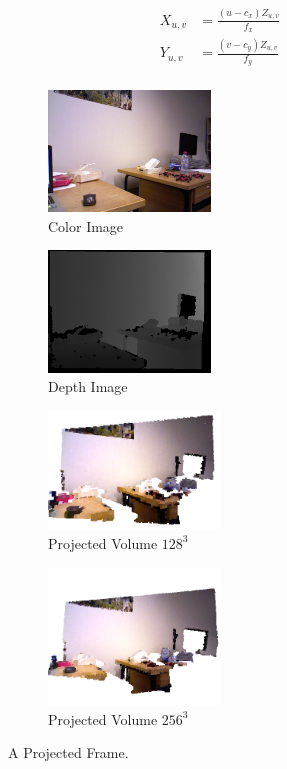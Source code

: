 \begin{equation} \label{eqn:PC_PROJECTION}
\begin{split}
X_{u,v} & = \frac{(u - c_x)Z_{u,v}}{f_x} \\
Y_{u,v} & = \frac{(v - c_y)Z_{u,v}}{f_y} \\
\end{split}
\end{equation}

\begin{figure}[!htb] 
        \centering
        \begin{subfigure}[b]{1.8in}
                \includegraphics[width=1.7in]{images/ch2/colorF11}
                \caption{Color Image}
                \label{fig:COLEXAMPLE}
        \end{subfigure}%
        \begin{subfigure}[b]{1.8in}
                \includegraphics[width=1.7in]{images/ch2/depthF11}
                \caption{Depth Image}
                \label{fig:DEPTHEXAMPLE}
        \end{subfigure}
        
         \begin{subfigure}[b]{1.8in}
                \includegraphics[width=1.8in]{images/ch2/volumeF11128}
                \caption{Projected Volume $128^3$}
                \label{fig:VOLUMEEXAMPLE128}
        \end{subfigure}%
         \begin{subfigure}[b]{1.8in}
                \includegraphics[width=1.8in]{images/ch2/volumeF11256}
                \caption{Projected Volume $256^3$}
                \label{fig:VOLUMEEXAMPLE384}
        \end{subfigure}%
       \caption{A Projected Frame.}
       \label{fig:PROJECTED_FRAME}
\end{figure}



